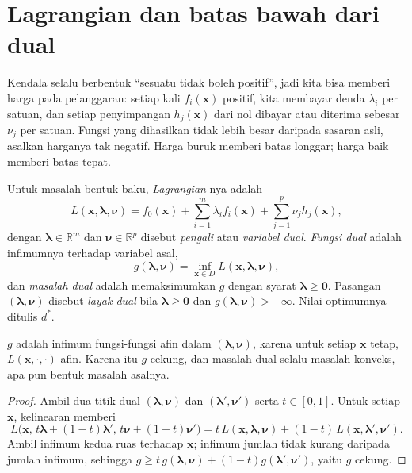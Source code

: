 \section{Lagrangian dan batas bawah dari dual}

Kendala selalu berbentuk ``sesuatu tidak boleh positif'', jadi kita bisa memberi harga
pada pelanggaran: setiap kali $f_{i}(\mathbf{x})$ positif, kita membayar denda
$\lambda_{i}$ per satuan, dan setiap penyimpangan $h_{j}(\mathbf{x})$ dari nol dibayar
atau diterima sebesar $\nu_{j}$ per satuan. Fungsi yang dihasilkan tidak lebih besar
daripada sasaran asli, asalkan harganya tak negatif. Harga buruk memberi batas longgar;
harga baik memberi batas tepat.

\begin{definisi}
Untuk masalah bentuk baku, \emph{Lagrangian}-nya adalah
\[
  L(\mathbf{x},\boldsymbol{\lambda},\boldsymbol{\nu})
  =f_{0}(\mathbf{x})+\sum_{i=1}^{m}\lambda_{i}f_{i}(\mathbf{x})
   +\sum_{j=1}^{p}\nu_{j}h_{j}(\mathbf{x}),
\]
dengan $\boldsymbol{\lambda}\in\mathbb{R}^{m}$ dan $\boldsymbol{\nu}\in\mathbb{R}^{p}$
disebut \emph{pengali} atau \emph{variabel dual}. \emph{Fungsi dual} adalah infimumnya
terhadap variabel asal,
\[
  g(\boldsymbol{\lambda},\boldsymbol{\nu})
  =\inf_{\mathbf{x}\in D}L(\mathbf{x},\boldsymbol{\lambda},\boldsymbol{\nu}),
\]
dan \emph{masalah dual} adalah memaksimumkan $g$ dengan syarat
$\boldsymbol{\lambda}\ge\mathbf{0}$. Pasangan $(\boldsymbol{\lambda},\boldsymbol{\nu})$
disebut \emph{layak dual} bila $\boldsymbol{\lambda}\ge\mathbf{0}$ dan
$g(\boldsymbol{\lambda},\boldsymbol{\nu})>-\infty$. Nilai optimumnya ditulis $d^{*}$.
\end{definisi}

\begin{proposisi}
$g$ adalah infimum fungsi-fungsi afin dalam $(\boldsymbol{\lambda},\boldsymbol{\nu})$,
karena untuk setiap $\mathbf{x}$ tetap, $L(\mathbf{x},\cdot,\cdot)$ afin. Karena itu $g$
cekung, dan masalah dual selalu masalah konveks, apa pun bentuk masalah asalnya.
\end{proposisi}

\begin{proof}
Ambil dua titik dual $(\boldsymbol{\lambda},\boldsymbol{\nu})$ dan
$(\boldsymbol{\lambda}',\boldsymbol{\nu}')$ serta $t\in[0,1]$. Untuk setiap $\mathbf{x}$,
kelinearan memberi
\[
  L\bigl(\mathbf{x},\,t\boldsymbol{\lambda}+(1-t)\boldsymbol{\lambda}',\,
  t\boldsymbol{\nu}+(1-t)\boldsymbol{\nu}'\bigr)
  =t\,L(\mathbf{x},\boldsymbol{\lambda},\boldsymbol{\nu})
   +(1-t)\,L(\mathbf{x},\boldsymbol{\lambda}',\boldsymbol{\nu}').
\]
Ambil infimum kedua ruas terhadap $\mathbf{x}$; infimum jumlah tidak kurang daripada
jumlah infimum, sehingga
$g\ge t\,g(\boldsymbol{\lambda},\boldsymbol{\nu})
+(1-t)g(\boldsymbol{\lambda}',\boldsymbol{\nu}')$, yaitu $g$ cekung.
\end{proof}

